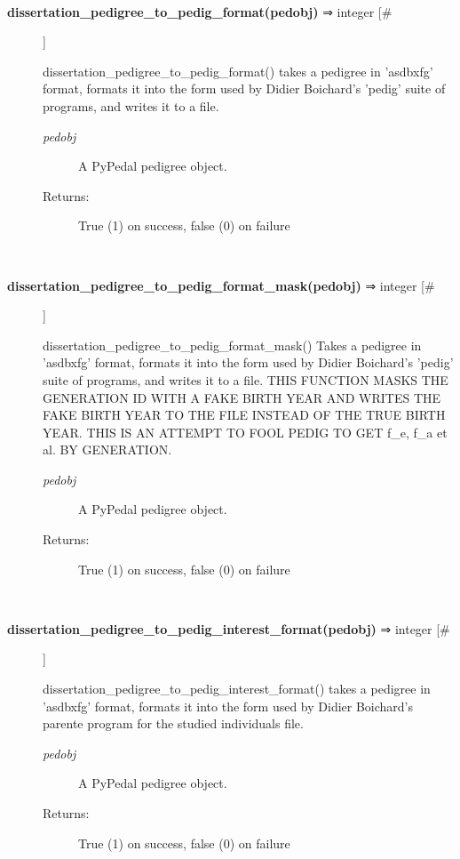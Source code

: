 \documentclass[10pt]{article}
\begin{document}
\begin{description}
\begin{description}
\end{description}
\\ 

\item[\textbf{dissertation\_pedigree\_to\_pedig\_format(pedobj)}
 ⇒ integer [\#]]

 dissertation\_pedigree\_to\_pedig\_format() takes a pedigree in 'asdbxfg' format, formats it into the form used by Didier Boichard's 'pedig' suite of programs, and writes it to a file.
\begin{description}
\item[\emph{pedobj}
] A PyPedal pedigree object.
\item[Returns:] True (1) on success, false (0) on failure

\end{description}
\\ 

\item[\textbf{dissertation\_pedigree\_to\_pedig\_format\_mask(pedobj)}
 ⇒ integer [\#]]

 dissertation\_pedigree\_to\_pedig\_format\_mask() Takes a pedigree in 'asdbxfg' format, formats it into the form used by Didier Boichard's 'pedig' suite of programs, and writes it to a file. THIS FUNCTION MASKS THE GENERATION ID WITH A FAKE BIRTH YEAR AND WRITES THE FAKE BIRTH YEAR TO THE FILE INSTEAD OF THE TRUE BIRTH YEAR. THIS IS AN ATTEMPT TO FOOL PEDIG TO GET f\_e, f\_a et al. BY GENERATION.
\begin{description}
\item[\emph{pedobj}
] A PyPedal pedigree object.
\item[Returns:] True (1) on success, false (0) on failure

\end{description}
\\ 

\item[\textbf{dissertation\_pedigree\_to\_pedig\_interest\_format(pedobj)}
 ⇒ integer [\#]]

 dissertation\_pedigree\_to\_pedig\_interest\_format() takes a pedigree in 'asdbxfg' format, formats it into the form used by Didier Boichard's parente program for the studied individuals file.
\begin{description}
\item[\emph{pedobj}
] A PyPedal pedigree object.
\item[Returns:] True (1) on success, false (0) on failure

\end{description}
\\ 


\end{description}
\end{document}
